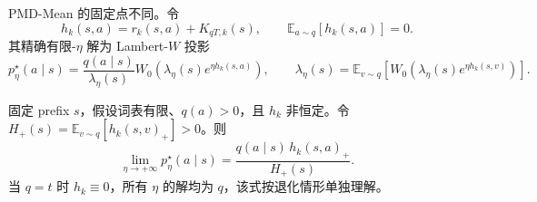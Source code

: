 PMD-Mean 的固定点不同。令
\begin{equation}
h_k(s,a)=r_k(s,a)+K_{qT,k}(s),
\qquad \mathbb E_{a\sim q}[h_k(s,a)]=0.
\end{equation}
其精确有限-$\eta$ 解为 Lambert-$W$ 投影
\begin{equation}
p^\star_{\eta}(a\mid s)
=\frac{q(a\mid s)}{\lambda_\eta(s)}
W_0\!\left(\lambda_\eta(s)e^{\eta h_k(s,a)}\right),
\qquad
\lambda_\eta(s)=\mathbb E_{v\sim q}
\left[W_0\!\left(\lambda_\eta(s)e^{\eta h_k(s,v)}\right)\right].
\label{eq:ch2-opd-pmd-mean-infinity-prelimit}
\end{equation}

\begin{proposition}
\label{prop:ch2-opd-pmd-mean-infinity}
固定 prefix $s$，假设词表有限、$q(a)>0$，且 $h_k$ 非恒定。令 $H_+(s)=\mathbb E_{v\sim q}[h_k(s,v)_+]>0$。则
\begin{equation}
\lim_{\eta\to+\infty}p^\star_{\eta}(a\mid s)
=\frac{q(a\mid s)\,h_k(s,a)_+}{H_+(s)}.
\label{eq:ch2-opd-pmd-mean-infinity-target}
\end{equation}
当 $q=t$ 时 $h_k\equiv0$，所有 $\eta$ 的解均为 $q$，该式按退化情形单独理解。
\end{proposition}

